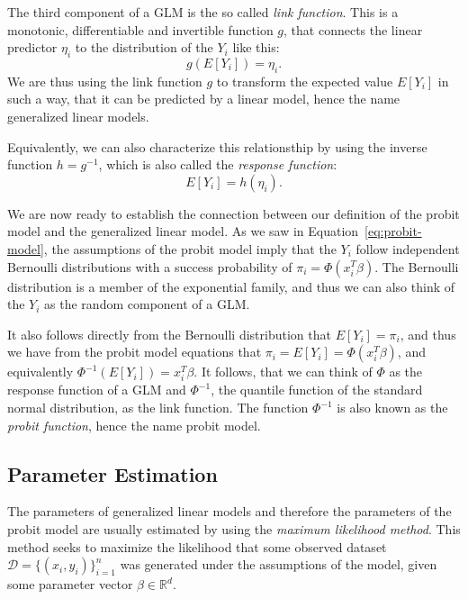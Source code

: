 The third component of a GLM is the so called \textit{link function}.
This is a monotonic, differentiable and invertible function
$g$,
that connects the linear predictor $\eta_i$ to the distribution of the
$Y_i$ like this:
\begin{equation*}
    g(E[Y_i]) = \eta_i.
\end{equation*}
We are thus using the link function $g$ to transform the expected value
$E[Y_i]$ in such a way, that it can be predicted by a linear model,
hence the name generalized linear models.

Equivalently, we can also characterize this relationsthip by using
the inverse function $h = g^{-1}$,
which is also called the \textit{response function}:
\begin{equation*}
    E[Y_i] = h(\eta_i).
\end{equation*}

We are now ready to establish the connection between
our definition of the probit model and
the generalized linear model.
As we saw in Equation~\ref{eq:probit-model}, the assumptions of the
probit model imply that the $Y_i$ follow independent Bernoulli distributions
with a success probability of $\pi_i = \Phi(x_i^T \beta)$.
The Bernoulli distribution is a member of the exponential family, and
thus we can also think of the $Y_i$ as the random component of a GLM.

It also follows directly from the Bernoulli distribution that
$E[Y_i] = \pi_i$, and thus we have from the probit model equations that
$\pi_i = E[Y_i] = \Phi(x_i^T \beta)$, and equivalently
$\Phi^{-1}(E[Y_i]) = x_i^T \beta$. It follows,
that we can think of $\Phi$ as the response
function of a GLM and $\Phi^{-1}$, the quantile function
of the standard normal distribution, as the link function.
The function $\Phi^{-1}$ is also known as the \textit{probit function},
hence the name probit model.

\subsection{Parameter Estimation}
\label{sec:parameter-estimation}

The parameters of generalized linear models and therefore the parameters
of the probit model are usually
estimated by using the \textit{maximum likelihood method}.
This method seeks to maximize the likelihood that some observed
dataset $\mathcal{D} = \{(x_i, y_i)\}_{i=1}^n$ was generated under the
assumptions of the model, given some parameter vector
$\beta \in \mathbb{R}^d$.

